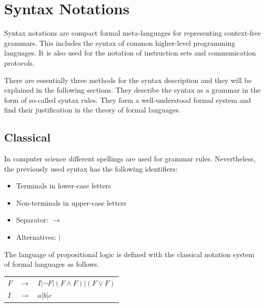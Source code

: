 \section{Syntax Notations}
Syntax notations are compact formal meta-languages for representing context-free grammars. This includes the syntax of common higher-level programming languages. It is also used for the notation of instruction sets and communication protocols.

There are essentially three methods for the syntax description and they will be explained in the following sections. They describe the syntax as a grammar in the form of so-called syntax rules. They form a well-understood formal system and find their justification in the theory of formal languages.

\subsection{Classical}
In computer science different spellings are used for grammar rules. Nevertheless, the previously used syntax has the following identifiers:
\begin{itemize}
\item Terminals in lower-case letters
\item Non-terminals in upper-case letters
\item Separator: $\rightarrow$ 
\item Alternatives: $|$
\end{itemize}
The language of propositional logic is defined with the classical notation system of formal languages as follows.

\begin{tabular}{lll}
$F$ & $\rightarrow$ & $I |\neg F |(F \wedge F) |(F \vee F)$\\
$I$ & $\rightarrow$ & $a | b | c$ \\
\end{tabular}

